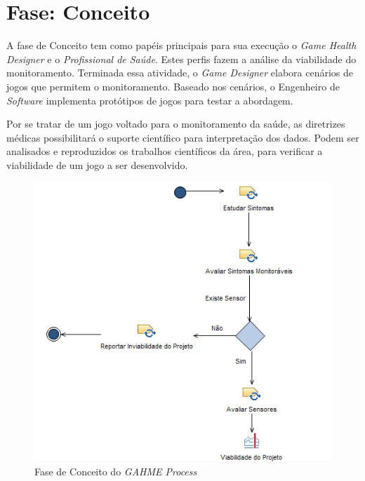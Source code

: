 \section{Fase: Conceito}\label{sec:conceito}
A fase de Conceito tem como papéis principais para sua execução o \textit{Game Health Designer} e o \textit{Profissional de Saúde}. Estes perfis fazem a análise da viabilidade do monitoramento. Terminada essa atividade, o \textit{Game Designer} elabora cenários de jogos que permitem o monitoramento. Baseado nos cenários, o Engenheiro de \textit{Software} implementa protótipos de jogos para testar a abordagem. 

Por se tratar de um jogo voltado para o monitoramento da saúde, as diretrizes médicas possibilitará o suporte científico para interpretação dos dados. Podem ser analisados e reproduzidos os trabalhos científicos da área, para verificar a viabilidade de um jogo a ser desenvolvido.

\begin{figure}[!htb]
 \centering
 \includegraphics[scale=0.8]{./img/gahme-fase-conceito.png}
\caption{Fase de Conceito do \textit{GAHME Process}}
 \label{fig:faseviabilidade}
\end{figure}



